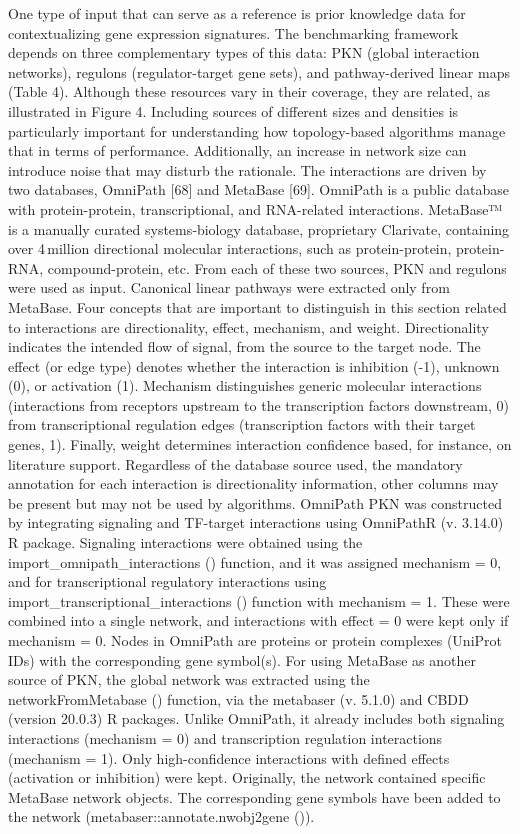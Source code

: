 One type of input that can serve as a reference is prior knowledge data for contextualizing gene expression signatures. 
The benchmarking framework depends on three complementary types of this data: 
PKN (global interaction networks), regulons (regulator-target gene sets), and pathway-derived linear maps (Table 4). 
Although these resources vary in their coverage, they are related, as illustrated in Figure 4. Including sources of different 
sizes and densities is particularly important for understanding how topology-based algorithms manage that in terms of performance. 
Additionally, an increase in network size can introduce noise that may disturb the rationale. 
The interactions are driven by two databases, OmniPath [68] and MetaBase [69].
OmniPath is a public database with protein-protein, transcriptional, and RNA-related interactions. MetaBase™ is a manually curated 
systems‐biology database, proprietary Clarivate, containing over 4 million directional molecular interactions, such as protein-protein, 
protein-RNA, compound-protein, etc. 
From each of these two sources, PKN and regulons were used as input. Canonical linear pathways were extracted only from MetaBase. 
Four concepts that are important to distinguish in this section related to interactions are directionality, effect, mechanism, and weight. 
Directionality indicates the intended flow of signal, from the source to the target node. The effect (or edge type) denotes whether the 
interaction is inhibition (-1), unknown (0), or activation (1). Mechanism distinguishes generic molecular interactions (interactions from 
receptors upstream to the transcription factors downstream, 0) from transcriptional regulation edges (transcription factors with their target genes, 1). 
Finally, weight determines interaction confidence based, for instance, on literature support. Regardless of the database source used, the mandatory
 annotation for each interaction is directionality information, other columns may be present but may not be used by algorithms. 
OmniPath PKN was constructed by integrating signaling and TF-target interactions using OmniPathR (v. 3.14.0) R package. Signaling interactions were 
obtained using the import_omnipath_interactions () function, and it was assigned mechanism = 0, and for transcriptional regulatory interactions 
using import_transcriptional_interactions () function with mechanism = 1. These were combined into a single network, and interactions with effect = 0 were kept only if mechanism = 0. Nodes in OmniPath are proteins or protein complexes (UniProt IDs) with the corresponding gene symbol(s). For using MetaBase as another source of PKN, the global network was extracted using the networkFromMetabase () function, via the metabaser (v. 5.1.0) and CBDD (version 20.0.3) R packages. Unlike OmniPath, it already includes both signaling interactions (mechanism = 0) and transcription regulation interactions (mechanism = 1). Only high-confidence interactions with defined effects (activation or inhibition) were kept. Originally, the network contained specific MetaBase network objects. The corresponding gene symbols have been added to the network (metabaser::annotate.nwobj2gene ()).
